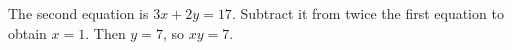 The second equation is $3x+2y=17$. Subtract it from twice the first equation to obtain $x=1$. Then $y=7$, so $\boxed{xy=7}$.

